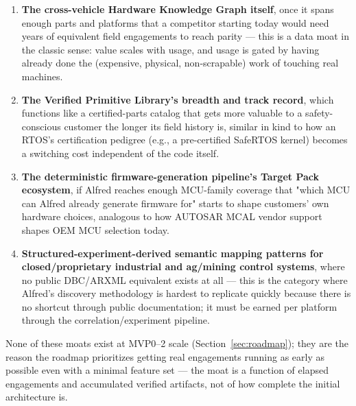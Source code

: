 \begin{enumerate}
\item \textbf{The cross-vehicle Hardware Knowledge Graph itself}, once it spans enough parts and platforms that a competitor starting today would need years of equivalent field engagements to reach parity --- this is a data moat in the classic sense: value scales with usage, and usage is gated by having already done the (expensive, physical, non-scrapable) work of touching real machines.
\item \textbf{The Verified Primitive Library's breadth and track record}, which functions like a certified-parts catalog that gets more valuable to a safety-conscious customer the longer its field history is, similar in kind to how an RTOS's certification pedigree (e.g., a pre-certified SafeRTOS kernel) becomes a switching cost independent of the code itself.
\item \textbf{The deterministic firmware-generation pipeline's Target Pack ecosystem}, if Alfred reaches enough MCU-family coverage that "which MCU can Alfred already generate firmware for" starts to shape customers' own hardware choices, analogous to how AUTOSAR MCAL vendor support shapes OEM MCU selection today.
\item \textbf{Structured-experiment-derived semantic mapping patterns for closed/proprietary industrial and ag/mining control systems}, where no public DBC/ARXML equivalent exists at all --- this is the category where Alfred's discovery methodology is hardest to replicate quickly because there is no shortcut through public documentation; it must be earned per platform through the correlation/experiment pipeline.
\end{enumerate}

None of these moats exist at MVP0--2 scale (Section~\ref{sec:roadmap}); they are the reason the roadmap prioritizes getting real engagements running as early as possible even with a minimal feature set --- the moat is a function of elapsed engagements and accumulated verified artifacts, not of how complete the initial architecture is.
